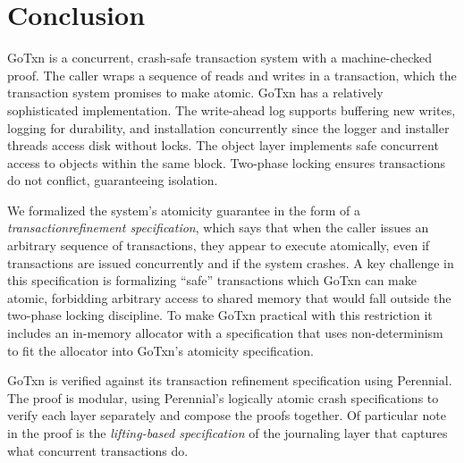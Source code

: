 \section{Conclusion}
\label{sec:txn:concl}

GoTxn is a concurrent, crash-safe transaction system with a machine-checked
proof. The caller wraps a sequence of reads and writes in a transaction, which
the transaction system promises to make atomic. GoTxn has a relatively
sophisticated implementation. The write-ahead log supports buffering new writes,
logging for durability, and installation concurrently since the logger and
installer threads access disk without locks. The object layer implements
safe concurrent access to objects within the same block. Two-phase locking
ensures transactions do not conflict, guaranteeing isolation.

We formalized the system's atomicity guarantee in the form of a
\emph{transactionrefinement specification}, which says that when the caller issues an arbitrary
sequence of transactions, they appear to execute atomically, even if
transactions are issued concurrently and if the system crashes. A key challenge
in this specification is formalizing ``safe'' transactions which GoTxn can make
atomic, forbidding arbitrary access to shared memory that would fall outside the
two-phase locking discipline. To make GoTxn practical with this restriction it
includes an in-memory allocator with a specification that uses non-determinism
to fit the allocator into GoTxn's atomicity specification.

GoTxn is verified against its transaction refinement specification using Perennial.
The proof is modular, using Perennial's logically atomic crash specifications to
verify each layer separately and compose the proofs together. Of particular note
in the proof is the \emph{lifting-based specification} of the
journaling layer that captures what concurrent transactions do.
